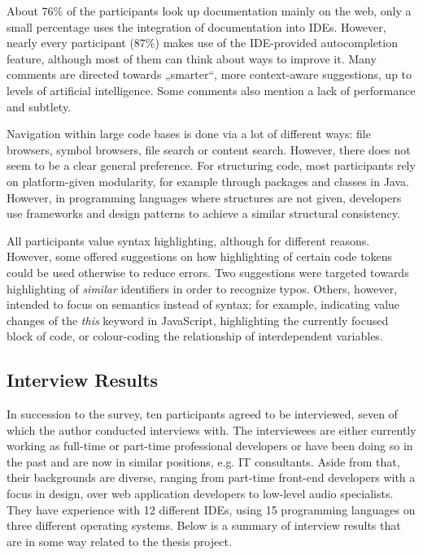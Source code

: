 About 76\% of the participants look up documentation mainly on the web,
only a small percentage uses the integration of documentation into IDEs.
However, nearly every participant (87\%) makes use of the IDE-provided
autocompletion feature, although most of them can think about ways to
improve it. Many comments are directed towards „smarter“, more
context-aware suggestions, up to levels of artificial intelligence. Some
comments also mention a lack of performance and subtlety.

Navigation within large code bases is done via a lot of different ways:
file browsers, symbol browsers, file search or content search. However,
there does not seem to be a clear general preference. For structuring
code, most participants rely on platform-given modularity, for example
through packages and classes in Java. However, in programming languages
where structures are not given, developers use frameworks and design
patterns to achieve a similar structural consistency.

All participants value syntax highlighting, although for different
reasons. However, some offered suggestions on how highlighting of
certain code tokens could be used otherwise to reduce errors. Two
suggestions were targeted towards highlighting of \emph{similar}
identifiers in order to recognize typos. Others, however, intended to
focus on semantics instead of syntax; for example, indicating value
changes of the \emph{this} keyword in JavaScript, highlighting the
currently focused block of code, or colour-coding the relationship of
interdependent variables.

\subsection{Interview Results}\label{interview-results}

In succession to the survey, ten participants agreed to be interviewed,
seven of which the author conducted interviews with. The interviewees
are either currently working as full-time or part-time professional
developers or have been doing so in the past and are now in similar
positions, e.g. IT consultants. Aside from that, their backgrounds are
diverse, ranging from part-time front-end developers with a focus in
design, over web application developers to low-level audio specialists.
They have experience with 12 different IDEs, using 15 programming
languages on three different operating systems. Below is a summary of
interview results that are in some way related to the thesis project.

